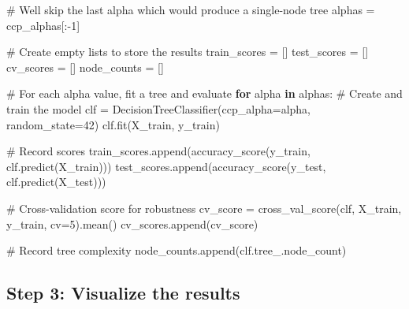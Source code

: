 \documentclass[
  letterpaper,
  DIV=11,
  numbers=noendperiod]{scrreprt}
\newenvironment{Shaded}{\begin{snugshade}}{\end{snugshade}}
\newcommand{\CommentTok}[1]{\textcolor[rgb]{0.37,0.37,0.37}{#1}}
\newcommand{\ControlFlowTok}[1]{\textcolor[rgb]{0.00,0.23,0.31}{\textbf{#1}}}
\newcommand{\DecValTok}[1]{\textcolor[rgb]{0.68,0.00,0.00}{#1}}
\newcommand{\KeywordTok}[1]{\textcolor[rgb]{0.00,0.23,0.31}{\textbf{#1}}}
\newcommand{\NormalTok}[1]{\textcolor[rgb]{0.00,0.23,0.31}{#1}}
\newcommand{\OperatorTok}[1]{\textcolor[rgb]{0.37,0.37,0.37}{#1}}
\begin{document}
\begin{Shaded}
\begin{Highlighting}[]

\CommentTok{\# We\textquotesingle{}ll skip the last alpha which would produce a single{-}node tree}
\NormalTok{alphas }\OperatorTok{=}\NormalTok{ ccp\_alphas[:}\OperatorTok{{-}}\DecValTok{1}\NormalTok{]}

\CommentTok{\# Create empty lists to store the results}
\NormalTok{train\_scores }\OperatorTok{=}\NormalTok{ []}
\NormalTok{test\_scores }\OperatorTok{=}\NormalTok{ []}
\NormalTok{cv\_scores }\OperatorTok{=}\NormalTok{ []}
\NormalTok{node\_counts }\OperatorTok{=}\NormalTok{ []}

\CommentTok{\# For each alpha value, fit a tree and evaluate}
\ControlFlowTok{for}\NormalTok{ alpha }\KeywordTok{in}\NormalTok{ alphas:}
    \CommentTok{\# Create and train the model}
\NormalTok{    clf }\OperatorTok{=}\NormalTok{ DecisionTreeClassifier(ccp\_alpha}\OperatorTok{=}\NormalTok{alpha, random\_state}\OperatorTok{=}\DecValTok{42}\NormalTok{)}
\NormalTok{    clf.fit(X\_train, y\_train)}
    
    \CommentTok{\# Record scores}
\NormalTok{    train\_scores.append(accuracy\_score(y\_train, clf.predict(X\_train)))}
\NormalTok{    test\_scores.append(accuracy\_score(y\_test, clf.predict(X\_test)))}
    
    \CommentTok{\# Cross{-}validation score for robustness}
\NormalTok{    cv\_score }\OperatorTok{=}\NormalTok{ cross\_val\_score(clf, X\_train, y\_train, cv}\OperatorTok{=}\DecValTok{5}\NormalTok{).mean()}
\NormalTok{    cv\_scores.append(cv\_score)}
    
    \CommentTok{\# Record tree complexity}
\NormalTok{    node\_counts.append(clf.tree\_.node\_count)}
\end{Highlighting}
\end{Shaded}

\subsection{Step 3: Visualize the
results}\label{step-3-visualize-the-results}
\end{document}
